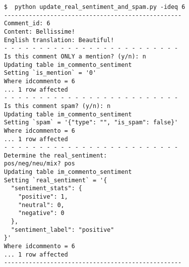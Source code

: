 \begin{verbatim}
$  python update_real_sentiment_and_spam.py -ideq 6
--------------------------------------------------
Comment_id: 6
Content: Bellissime!
English translation: Beautiful!
- - - - - - - - - - - - - - - - - - - - - - - - - 
Is this comment ONLY a mention? (y/n): n
Updating table im_commento_sentiment
Setting `is_mention` = '0' 
Where idcommento = 6 
... 1 row affected
- - - - - - - - - - - - - - - - - - - - - - - - - 
Is this comment spam? (y/n): n
Updating table im_commento_sentiment
Setting `spam` = '{"type": "", "is_spam": false}' 
Where idcommento = 6 
... 1 row affected
- - - - - - - - - - - - - - - - - - - - - - - - - 
Determine the real_sentiment:
pos/neg/neu/mix? pos
Updating table im_commento_sentiment
Setting `real_sentiment` = '{
  "sentiment_stats": {
    "positive": 1, 
    "neutral": 0, 
    "negative": 0
  }, 
  "sentiment_label": "positive"
}'
Where idcommento = 6 
... 1 row affected
--------------------------------------------------
\end{verbatim}




